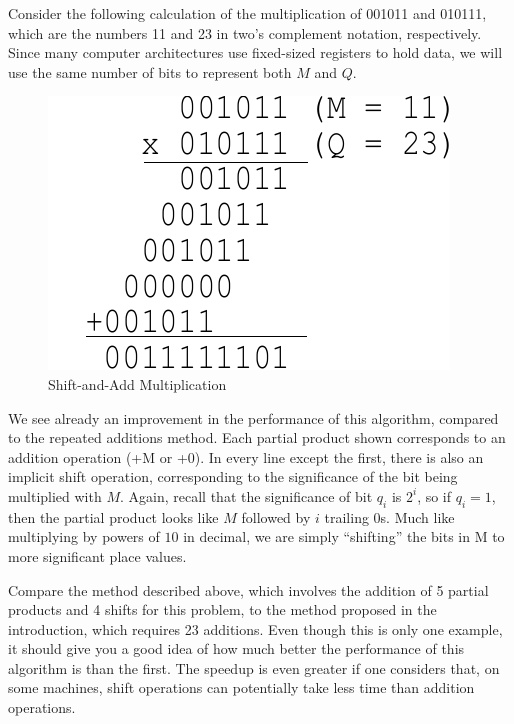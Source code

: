 \documentclass{article}
\begin{document}
\pagebreak

Consider the following calculation of the multiplication of 001011 and 010111, which are the numbers 11 and 23 in two's complement notation, respectively.
Since many computer architectures use fixed-sized registers to hold data, we will use the same number of bits to represent both $M$ and $Q$.

\begin{figure}[h]
\centering
\includegraphics[scale=0.7]{saam3.pdf}
\caption{Shift-and-Add Multiplication}
\end{figure}

We see already an improvement in the performance of this algorithm, compared to the repeated additions method.
Each partial product shown corresponds to an addition operation (+M or +0).
In every line except the first, there is also an implicit shift operation, corresponding to the significance of the bit being multiplied with $M$.
Again, recall that the significance of bit $q_i$ is $2^i$, so if $q_i = 1$, then the partial product looks like $M$ followed by $i$ trailing 0s.
Much like multiplying by powers of $10$ in decimal, we are simply ``shifting'' the bits in M to more significant place values.

Compare the method described above, which involves the addition of 5 partial products and 4 shifts for this problem, to the method proposed in the introduction, which requires 23 additions.
Even though this is only one example, it should give you a good idea of how much better the performance of this algorithm is than the first.
The speedup is even greater if one considers that, on some machines, shift operations can potentially take less time than addition operations.
\end{document}
